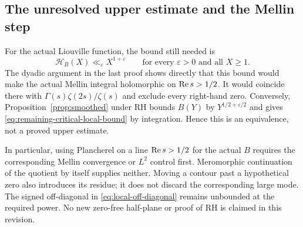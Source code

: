 \subsection{The unresolved upper estimate and the Mellin step}

For the actual Liouville function, the bound still needed is
\begin{equation}\label{eq:remaining-critical-local-bound}
 \mathcal H_B(X)\ll_\varepsilon X^{1+\varepsilon}
 \qquad\text{for every }\varepsilon>0\text{ and all }X\ge1.
\end{equation}
The dyadic argument in the last proof shows directly that this bound
would make the actual Mellin integral holomorphic on $\operatorname{Re} s>1/2$.
It would coincide there with $\Gamma(s)\zeta(2s)/\zeta(s)$ and
exclude every right-hand zero. Conversely, Proposition~\ref{prop:smoothed}
under RH bounds $B(Y)$ by $Y^{1/2+\varepsilon/2}$ and gives
\eqref{eq:remaining-critical-local-bound} by integration. Hence this is
an equivalence, not a proved upper estimate.

In particular, using Plancherel on a line $\operatorname{Re} s>1/2$ for the actual
$B$ requires the corresponding Mellin convergence or $L^2$ control
first. Meromorphic continuation of the quotient by itself supplies
neither. Moving a contour past a hypothetical zero also introduces
its residue; it does not discard the corresponding large mode.
The signed off-diagonal in \eqref{eq:local-off-diagonal} remains
unbounded at the required power. No new zero-free half-plane or
proof of RH is claimed in this revision.
